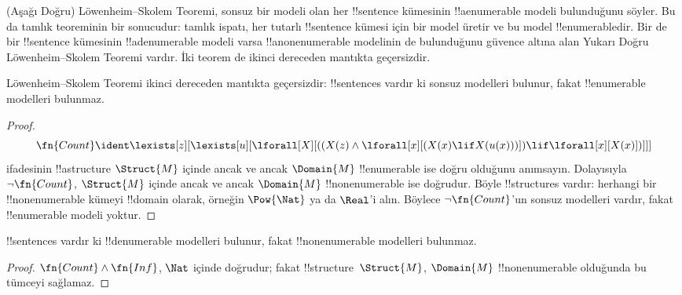 \documentclass[../../../include/open-logic-section]{subfiles}
\begin{document}


\begin{explain}
(Aşağı Doğru) Löwenheim--Skolem Teoremi, sonsuz bir modeli olan her
!!{sentence} kümesinin !!a{enumerable} modeli bulunduğunu söyler. Bu da tamlık
teoreminin bir sonucudur: tamlık ispatı, her tutarlı !!{sentence} kümesi için
bir model üretir ve bu model !!{enumerable}{}dir. Bir de bir !!{sentence}
kümesinin !!a{denumerable} modeli varsa !!a{nonenumerable} modelinin de
bulunduğunu güvence altına alan Yukarı Doğru Löwenheim--Skolem Teoremi
vardır. İki teorem de ikinci dereceden mantıkta geçersizdir.
\end{explain}


\begin{thm}
 Löwenheim--Skolem Teoremi ikinci dereceden mantıkta
geçersizdir: !!{sentence}s vardır ki sonsuz modelleri bulunur, fakat
!!{enumerable} modelleri bulunmaz.
\end{thm}

\begin{proof}
\[
\fn{Count} \ident \lexists[z][\lexists[u][\lforall[X][((X(z) \land
      \lforall[x][(X(x) \lif X(u(x)))]) \lif \lforall[x][X(x)])]]]
\]
ifadesinin !!a{structure} $\Struct{M}$ içinde ancak ve ancak $\Domain{M}$
!!{enumerable} ise doğru olduğunu anımsayın. Dolayısıyla
$\lnot\fn{Count}$, $\Struct{M}$ içinde ancak ve ancak $\Domain{M}$
!!{nonenumerable} ise doğrudur. Böyle !!{structure}s vardır: herhangi bir
!!{nonenumerable} kümeyi !!{domain} olarak, örneğin $\Pow{\Nat}$ ya da
$\Real$'i alın. Böylece $\lnot\fn{Count}$'un sonsuz modelleri vardır, fakat
!!{enumerable} modeli yoktur.
\end{proof}

\begin{thm}
!!{sentence}s vardır ki !!{denumerable} modelleri bulunur, fakat
!!{nonenumerable} modelleri bulunmaz.
\end{thm}

\begin{proof}
$\fn{Count}\land\fn{Inf}$, $\Nat$ içinde doğrudur; fakat
!!{structure}~$\Struct{M}$, $\Domain{M}$ !!{nonenumerable} olduğunda bu
tümceyi sağlamaz.
\end{proof}
\end{document}
